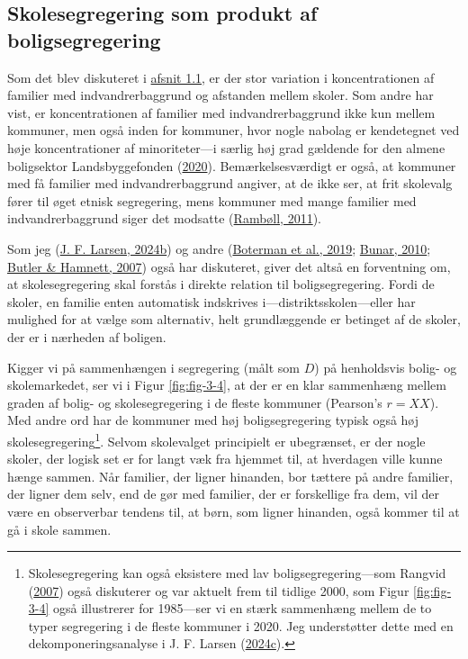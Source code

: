 \documentclass[
]{book}
\begin{document}
\hypertarget{skolesegregering-som-produkt-af-boligsegregering}{%
\subsection{Skolesegregering som produkt af boligsegregering}\label{skolesegregering-som-produkt-af-boligsegregering}}

Som det blev diskuteret i \protect\hyperlink{det-danske-skolelandskab}{afsnit 1.1}, er der stor variation i koncentrationen af familier med indvandrerbaggrund og afstanden mellem skoler. Som andre har vist, er koncentrationen af familier med indvandrerbaggrund ikke kun mellem kommuner, men også inden for kommuner, hvor nogle nabolag er kendetegnet ved høje koncentrationer af minoriteter---i særlig høj grad gældende for den almene boligsektor Landsbyggefonden (\protect\hyperlink{ref-landsbyggefonden2020}{2020}). Bemærkelsesværdigt er også, at kommuner med få familier med indvandrerbaggrund angiver, at de ikke ser, at frit skolevalg fører til øget etnisk segregering, mens kommuner med mange familier med indvandrerbaggrund siger det modsatte (\protect\hyperlink{ref-rambuxf8ll2011}{Rambøll, 2011}).

Som jeg (\protect\hyperlink{ref-larsen2024c}{J. F. Larsen, 2024b}) og andre (\protect\hyperlink{ref-boterman2019}{Boterman et al., 2019}; \protect\hyperlink{ref-bunar2010}{Bunar, 2010}; \protect\hyperlink{ref-butler2007}{Butler \& Hamnett, 2007}) også har diskuteret, giver det altså en forventning om, at skolesegregering skal forstås i direkte relation til boligsegregering. Fordi de skoler, en familie enten automatisk indskrives i---distriktsskolen---eller har mulighed for at vælge som alternativ, helt grundlæggende er betinget af de skoler, der er i nærheden af boligen.

Kigger vi på sammenhængen i segregering (målt som \(D\)) på henholdsvis bolig- og skolemarkedet, ser vi i Figur \ref{fig:fig-3-4}, at der er en klar sammenhæng mellem graden af bolig- og skolesegregering i de fleste kommuner (Pearson's \(r=XX\)). Med andre ord har de kommuner med høj boligsegregering typisk også høj skolesegregering\footnote{Skolesegregering kan også eksistere med lav boligsegregering---som Rangvid (\protect\hyperlink{ref-rangvid2007}{2007}) også diskuterer og var aktuelt frem til tidlige 2000, som Figur \ref{fig:fig-3-4} også illustrerer for 1985---ser vi en stærk sammenhæng mellem de to typer segregering i de fleste kommuner i 2020. Jeg understøtter dette med en dekomponeringsanalyse i J. F. Larsen (\protect\hyperlink{ref-larsen2024b}{2024c}).}. Selvom skolevalget principielt er ubegrænset, er der nogle skoler, der logisk set er for langt væk fra hjemmet til, at hverdagen ville kunne hænge sammen. Når familier, der ligner hinanden, bor tættere på andre familier, der ligner dem selv, end de gør med familier, der er forskellige fra dem, vil der være en observerbar tendens til, at børn, som ligner hinanden, også kommer til at gå i skole sammen.
\end{document}
